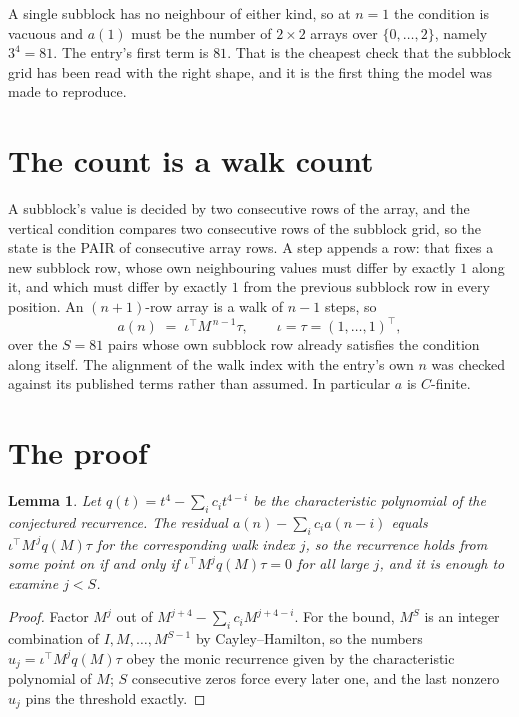 \documentclass[11pt,a4paper]{article}
\theoremstyle{plain}
\newtheorem{lemma}[theorem]{Lemma}
\theoremstyle{definition}
\begin{document}
A single subblock has no neighbour of either kind, so at $n=1$ the condition is vacuous and
$a(1)$ must be the number of $2\times2$ arrays over $\{0,\dots,2\}$, namely
$3^{4}=81$. The entry's first term is $81$.
That is the cheapest check that the subblock grid has been read with the right shape, and it
is the first thing the model was made to reproduce.

\section{The count is a walk count}

A subblock's value is decided by two consecutive rows of the array, and the
vertical condition compares two consecutive rows of the subblock grid, so the state is the
PAIR of consecutive array rows. A step appends a row: that fixes a new subblock row, whose own
neighbouring values must differ by exactly $1$ along it, and which must differ by exactly
$1$ from the previous subblock row in every position. An $(n+1)$-row array is a walk of
$n-1$ steps, so
\[
a(n)\;=\;\iota^{\!\top}M^{\,n-1}\tau,\qquad\iota=\tau=(1,\dots,1)^{\!\top},
\]
over the $S=81$ pairs whose own subblock row already satisfies the condition along itself.
The alignment of the walk index with the entry's own $n$ was checked against its published
terms rather than assumed. In particular $a$ is $C$-finite.

\section{The proof}

\begin{lemma}\label{lem:crit}
Let $q(t)=t^{4}-\sum_i c_it^{4-i}$ be the characteristic polynomial of the
conjectured recurrence. The residual $a(n)-\sum_ic_ia(n-i)$ equals
$\iota^{\!\top}M^{\,j}q(M)\tau$ for the corresponding walk index $j$, so the recurrence
holds from some point on if and only if $\iota^{\!\top}M^{j}q(M)\tau=0$ for all large $j$,
and it is enough to examine $j<S$.
\end{lemma}

\begin{proof}
Factor $M^{j}$ out of $M^{j+4}-\sum_ic_iM^{j+4-i}$. For the bound, $M^{S}$
is an integer combination of $I,M,\dots,M^{S-1}$ by Cayley--Hamilton, so the numbers
$u_j=\iota^{\!\top}M^{j}q(M)\tau$ obey the monic recurrence given by the characteristic
polynomial of $M$; $S$ consecutive zeros force every later one, and the last nonzero $u_j$
pins the threshold exactly.
\end{proof}
\end{document}
